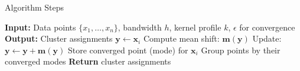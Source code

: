 \begin{frame}{Algorithm Steps}
    \begin{algorithm}[H]
        \caption{Mean Shift Clustering}
        \begin{algorithmic}[1]
            \State \textbf{Input:} Data points $\{x_1, \ldots, x_n\}$, bandwidth $h$, kernel profile $k$, $\epsilon$ for convergence
            \State \textbf{Output:} Cluster assignments
            \State
                \State $\mathbf{y} \gets \mathbf{x}_i$ 
                    \State Compute mean shift: $\mathbf{m}(\mathbf{y})$
                    \State Update: $\mathbf{y} \gets \mathbf{y} + \mathbf{m}(\mathbf{y})$
                \EndWhile
                \State Store converged point (mode) for $\mathbf{x}_i$
            \EndFor
            \State
            \State Group points by their converged modes
            \State \textbf{Return} cluster assignments
        \end{algorithmic}
    \end{algorithm}
\end{frame}
